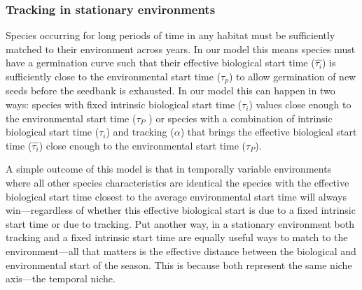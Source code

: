 \documentclass[11pt,letterpaper]{article}
\begin{document}
\subsubsection{Tracking in stationary environments}
Species occurring for long periods of time in any habitat must be sufficiently matched to their environment across years. In our model this means species must have a germination curve such that their effective biological start time ($\hat{\tau_{i}}$) is sufficiently close to the environmental start time ($\tau_{p}$) to allow germination of new seeds before the seedbank is exhausted. In our model this can happen in two ways: species with fixed intrinsic biological start time ($\tau_i$) values close enough to the environmental start time ($\tau_P$ ) or species with a combination of intrinsic biological start time ($\tau_i$) and tracking ($\alpha$) that brings the effective biological start time ($\hat{\tau_{i}}$) close enough to the environmental start time ($\tau_P$).


A simple outcome of this model is that in temporally variable environments where all other species characteristics are identical the species with the effective biological start time closest to the average environmental start time will always win---regardless of whether this effective biological start is due to a fixed intrinsic start time or due to tracking. Put another way, in a stationary environment both tracking and a fixed intrinsic start time are equally useful ways to match to the environment---all that matters is the effective distance between the biological and environmental start of the season. This is because both represent the same niche axis---the temporal niche. 
\end{document}
